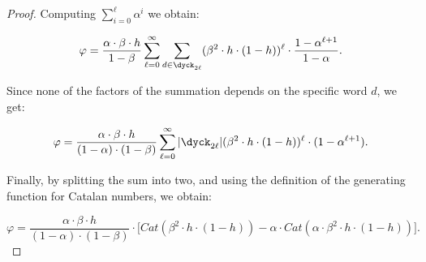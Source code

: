 \begin{proof}
Computing $\sum_{i=0}^{\ell}\alpha^i$ we obtain:

$$\varphi = \frac{\alpha\cdot \beta\cdot h}{1-\beta}\sum_{\ell=0}^{\infty}\sum_{d\in \dyck_{2\ell}}  (\beta^{2}\cdot h\cdot (1-h))^{\ell}\cdot \frac{1-\alpha^{\ell+1}}{1-\alpha}.$$

Since none of the factors of the summation depends on the specific word $d$, we get:

$$\varphi = \frac{\alpha\cdot \beta\cdot h}{(1-\alpha)\cdot (1-\beta)}\sum_{\ell=0}^{\infty} |\dyck_{2\ell}|  (\beta^{2}\cdot h\cdot (1-h))^{\ell}\cdot (1-\alpha^{\ell+1}).$$

Finally, by splitting the sum into two, and using the definition of the generating function for Catalan numbers, we obtain:

$$\varphi  =  \frac{\alpha\cdot \beta\cdot h}{(1-\alpha)\cdot (1-\beta)}\cdot \big[Cat(\beta^2\cdot h\cdot (1-h))-\alpha\cdot Cat(\alpha\cdot \beta^2\cdot h\cdot (1-h))\big].$$



\end{proof}



